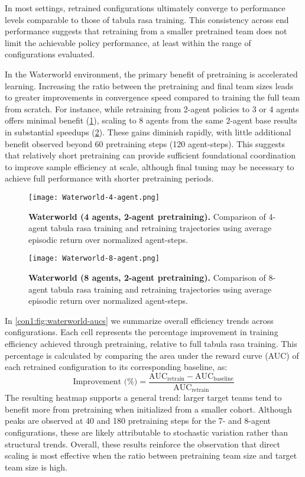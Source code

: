 In most settings, retrained configurations ultimately converge to 
performance levels comparable to those of tabula rasa training.
This consistency across end performance suggests that retraining from a smaller 
pretrained team does not limit the achievable policy performance, 
at least within the range of configurations evaluated.

In the Waterworld environment, the primary benefit of pretraining is accelerated learning. 
Increasing the ratio between the pretraining and final team sizes leads to greater improvements 
in convergence speed compared to training the full team from scratch. For instance, 
while retraining from 2-agent policies to 3 or 4 agents offers minimal benefit 
(\cref{con1:fig:waterworld-4}), scaling to 8 agents from the same 2-agent base results in 
substantial speedups (\cref{con1:fig:waterworld-8}). These gains diminish rapidly, 
with little additional benefit observed beyond 60 pretraining steps (120 agent-steps).
This suggests that relatively short pretraining can provide sufficient foundational 
coordination to improve sample efficiency at scale, although final tuning may 
be necessary to achieve full performance with shorter pretraining periods.

\begin{figure}[!ht]
    \centering
    \texttt{[image: Waterworld-4-agent.png]}
    \caption{\textbf{Waterworld (4 agents, 2-agent pretraining).} Comparison of 
    4-agent tabula rasa training and retraining trajectories using average 
    episodic return over normalized agent-steps.}
    \label{con1:fig:waterworld-4}
\end{figure}

\begin{figure}[!ht]
    \centering
    \texttt{[image: Waterworld-8-agent.png]}
    \caption{\textbf{Waterworld (8 agents, 2-agent pretraining).} Comparison of 
    8-agent tabula rasa training and retraining trajectories using average 
    episodic return over normalized agent-steps.}
    \label{con1:fig:waterworld-8}
\end{figure}

In \cref{con1:fig:waterworld-aucs} we summarize overall efficiency trends across configurations. 
Each cell represents the percentage improvement in training efficiency 
achieved through pretraining, relative to full tabula rasa training.
This percentage is calculated by comparing the area under the reward curve 
(AUC) of each retrained configuration to its corresponding baseline, as:
\[
    \text{Improvement (\%)} 
    = \frac{\text{AUC}_{\text{retrain}} - \text{AUC}_{\text{baseline}}}{\text{AUC}_{\text{retrain}}}
\]
The resulting heatmap supports a general trend: larger target teams tend to 
benefit more from pretraining when initialized from a smaller cohort.
Although peaks are observed at 40 and 180 pretraining steps for the 7- and 8-agent configurations, 
these are likely attributable to stochastic variation rather than structural trends.
Overall, these results reinforce the observation that direct scaling is most effective 
when the ratio between pretraining team size and target team size is high.

